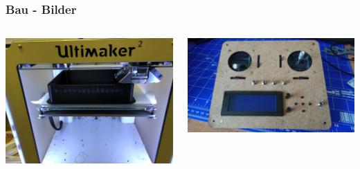 \documentclass[12pt,a4paper, ngerman]{beamer}
\begin{document}
\begin{frame}
\frametitle{Bau - Bilder}
\begin{columns}
\begin{center}
\includegraphics[width=1\textwidth]{Ferni (1).jpg}
\end{center}
\begin{center}
\includegraphics[width=1\textwidth]{Ferni (4).jpeg}
\end{center}
\end{columns}
\end{frame}
\end{document}
